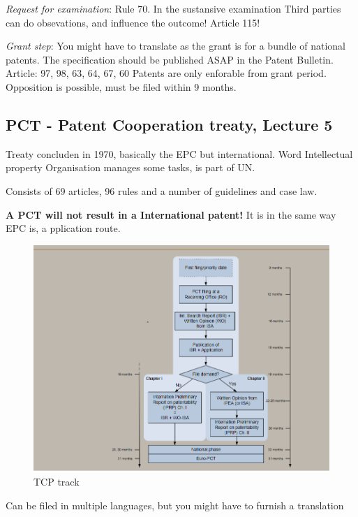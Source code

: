 \documentclass[12pt]{article} %
\begin{document}
\par \textit{Request for examination}: Rule 70.
In the sustansive examination Third parties can do obsevations, and influence the outcome!
Article 115!


\par \textit{Grant step}: You might have to translate as the grant is for a bundle of national patents. The specification should be published ASAP in the Patent Bulletin.
Article: 97, 98, 63, 64, 67, 60
Patents are only enforable from grant period. Opposition is possible, must be filed within 9 months.


\subsection{PCT - Patent Cooperation treaty, Lecture 5}
Treaty concluden in 1970, basically the EPC but international.
Word Intellectual property Organisation manages some tasks, is part of UN.

\par Consists of 69 articles, 96 rules and a number of guidelines and case law.

\textbf{A PCT will not result in a International patent!} It is in the same way EPC is, a pplication route.

\begin{figure}[H]
    \centering
    \includegraphics[width=\textwidth]{TCP_process.png} 
    \caption{TCP track}
    \label{fig:tcp_process}
\end{figure}

Can be filed in multiple languages, but you might have to furnish a translation
\end{document}
